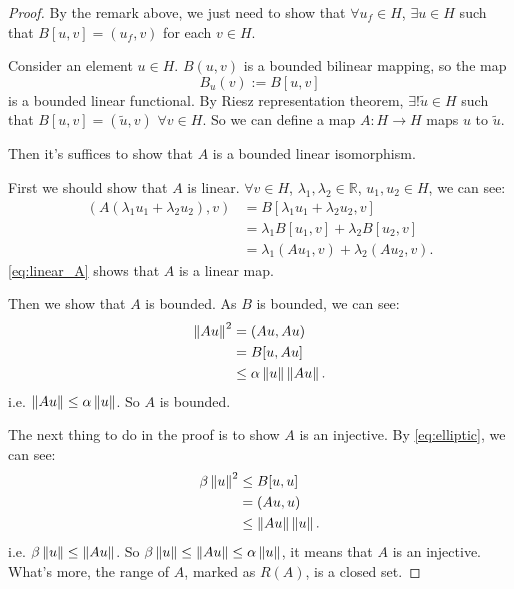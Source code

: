\begin{proof}

    By the remark above, we just need to show that $\forall u_{f}\in H$, $\exists u\in H$ such that $B[u,v]=(u_{f},v)$ for each $v\in H$.

    Consider an element $u\in H$. $B(u,v)$ is a bounded bilinear mapping, so the map 
    \begin{equation}
        \label{eq:Bu}
        B_{u}(v):=B[u,v]
    \end{equation}
    is a bounded linear functional. By Riesz representation theorem, $\exists !\tilde{u}\in H$ such that $B[u,v]=(\tilde{u},v)$ $\forall v\in H$. So we can define a map $A:H\rightarrow H$ maps $u$ to $\tilde{u}$.
    
    Then it's suffices to show that $A$ is a bounded linear isomorphism.

    First we should show that $A$ is linear. $\forall v\in H$, $\lambda_{1},\lambda_{2}\in\mathbb{R}$, $u_{1},u_{2}\in H$, we can see:
    \begin{equation}
        \label{eq:linear_A}
        \begin{aligned}
        (A(\lambda_{1}u_{1}+\lambda_{2}u_{2}),v)&=B[\lambda_{1}u_{1}+\lambda_{2}u_{2},v]\\
        &=\lambda_{1}B[u_{1},v]+\lambda_{2}B[u_{2},v]\\
        &=\lambda_{1}(Au_{1},v)+\lambda_{2}(Au_{2},v).
        \end{aligned}
    \end{equation}
    \eqref{eq:linear_A} shows that $A$ is a linear map. 

    Then we show that $A$ is bounded. As $B$ is bounded, we can see:
    \begin{equation}
        \label{eq:Bounded_A}
        \begin{aligned}
        \left\|Au\right\|^{2}&=(Au,Au)\\
        &=B[u,Au]\\
        &\le \alpha \left\|u\right\|\left\|Au\right\|.
        \end{aligned}
    \end{equation}
    i.e. $\left\|Au\right\|\le\alpha\left\|u\right\|$. So $A$ is bounded.

    The next thing to do in the proof is to show $A$ is an injective. By \eqref{eq:elliptic}, we can see:
    \begin{equation}
        \label{eq:injective_A}
        \begin{aligned}
        \beta\left\|u\right\|^{2}&\le B[u,u]\\
        &=(Au,u)\\
        &\le \left\|Au\right\|\left\|u\right\|.
        \end{aligned}
    \end{equation}
    i.e. $\beta\left\|u\right\|\le\left\|Au\right\|$. So $\beta\left\|u\right\|\le \left\|Au\right\|\le\alpha\left\|u\right\|$, it means that $A$ is an injective. What's more, the range of $A$, marked as $R(A)$, is a closed set.
    

\end{proof}
